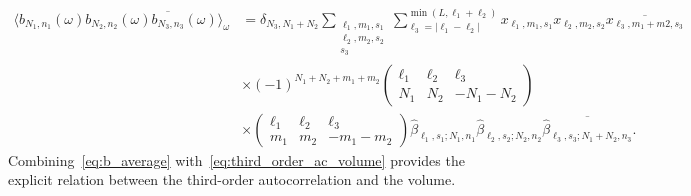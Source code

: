 \documentclass[12pt]{article}
\newcommand{\1}{\mathbf{1}}
\newcommand{\tamir}{x}
\theoremstyle{plain}
\theoremstyle{definition}
\theoremstyle{remark}
\theoremstyle{plain}
\theoremstyle{remark}
\theoremstyle{plain}
\theoremstyle{plain}
\begin{document}
\begin{align} \label{eq:b_average}
\langle b_{N_1,n_1}(\omega)b_{N_2,n_2}(\omega)\overline{b_{N_3,n_3}}(\omega)\rangle_{\omega} &= \delta_{N_3,N_1+N_2} \sum_{\substack{\ell_1,m_1,s_1\\\ell_2,m_2,s_2\\s_3}}\sum_{\ell_3=|\ell_1-\ell_2|}^{\min(L,\ell_1+\ell_2)}\tamir_{\ell_1,m_1,s_1}\tamir_{\ell_2,m_2,s_2}\overline{\tamir_{\ell_3,m_1+m2,s_3}}\\
&\times (-1)^{N_1+N_2+m_1+m_2}\left(\begin{array}{ccc}\ell_1 & \ell_2  & \ell_3\\ N_1 & N_2 & -N_1-N_2\end{array}\right)\nonumber\\&\times \left(\begin{array}{ccc}\ell_1 & \ell_2  & \ell_3\\ m_1 & m_2 & -m_1-m_2\end{array}\right) \widehat\beta_{\ell_1,s_1;N_1,n_1}\widehat\beta_{\ell_2,s_2;N_2,n_2}\overline{\widehat\beta_{\ell_3,s_3;N_1+N_2,n_3}}. \nonumber
\end{align}
Combining~\eqref{eq:b_average} with~\eqref{eq:third_order_ac_volume} provides the explicit relation between the third-order autocorrelation and the volume.   
\end{document}
